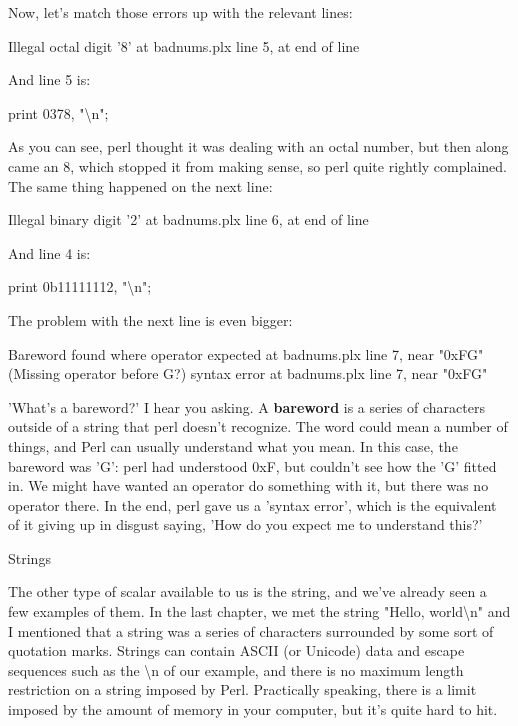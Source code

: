 \documentclass[a4paper,11pt]{book}
\begin{document}
\noindent Now, let's match those errors up with the relevant lines:

\noindent 

\noindent Illegal octal digit '8' at badnums.plx line 5, at end of line

\noindent 

\noindent And line 5 is:

\noindent 

\noindent 

\noindent print 0378, "\textbackslash n";

\noindent 

\noindent As you can see, perl thought it was dealing with an octal number, but then along came an 8, which stopped it from making sense, so perl quite rightly complained. The same thing happened on the next line:

\noindent 

\noindent Illegal binary digit '2' at badnums.plx line 6, at end of line

\noindent 

\noindent And line 4 is:

\noindent 

\noindent print 0b11111112, "\textbackslash n";

\noindent 

\noindent The problem with the next line is even bigger:

\noindent 

\noindent Bareword found where operator expected at badnums.plx line 7, near "0xFG" (Missing operator before G?) syntax error at badnums.plx line 7, near "0xFG"

\noindent 

\noindent 'What's a bareword?' I hear you asking. A \textbf{bareword }is a series of characters outside of a string that perl doesn't recognize. The word could mean a number of things, and Perl can usually understand what you mean. In this case, the bareword was 'G': perl had understood 0xF, but couldn't see how the 'G' fitted in. We might have wanted an operator do something with it, but there was no operator there. In the end, perl gave us a 'syntax error', which is the equivalent of it giving up in disgust saying, 'How do you expect me to understand this?'

\noindent 

\noindent Strings

\noindent 

\noindent The other type of scalar available to us is the string, and we've already seen a few examples of them. In the last chapter, we met the string "Hello, world\textbackslash n" and I mentioned that a string was a series of characters surrounded by some sort of quotation marks. Strings can contain ASCII (or Unicode) data and escape sequences such as the \textbackslash n of our example, and there is no maximum length restriction on a string imposed by Perl. Practically speaking, there is a limit imposed by the amount of memory in your computer, but it's quite hard to hit.
\end{document}
